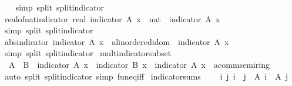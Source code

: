 \begin{isabellebody}
%
\isadelimproof
\ \ %
\endisadelimproof
%
\isatagproof
{}\isamarkupfalse%
\ {\isacharparenleft}simp\ split{\isacharcolon}\ split{\isacharunderscore}indicator{\isacharparenright}%
\endisatagproof
{\isafoldproof}%
%
\isadelimproof
\isanewline
%
\endisadelimproof
\isanewline
{}\isamarkupfalse%
\ real{\isacharunderscore}of{\isacharunderscore}nat{\isacharunderscore}indicator{\isacharcolon}\ {\isachardoublequoteopen}real\ {\isacharparenleft}indicator\ A\ x\ {\isacharcolon}{\isacharcolon}\ nat{\isacharparenright}\ {\isacharequal}\ indicator\ A\ x{\isachardoublequoteclose}\isanewline
%
\isadelimproof
\ \ %
\endisadelimproof
%
\isatagproof
{}\isamarkupfalse%
\ {\isacharparenleft}simp\ split{\isacharcolon}\ split{\isacharunderscore}indicator{\isacharparenright}%
\endisatagproof
{\isafoldproof}%
%
\isadelimproof
\isanewline
%
\endisadelimproof
\isanewline
{}\isamarkupfalse%
\ abs{\isacharunderscore}indicator{\isacharcolon}\ {\isachardoublequoteopen}{\isasymbar}indicator\ A\ x\ {\isacharcolon}{\isacharcolon}\ {\isacharprime}a{\isacharcolon}{\isacharcolon}linordered{\isacharunderscore}idom{\isasymbar}\ {\isacharequal}\ indicator\ A\ x{\isachardoublequoteclose}\isanewline
%
\isadelimproof
\ \ %
\endisadelimproof
%
\isatagproof
{}\isamarkupfalse%
\ {\isacharparenleft}simp\ split{\isacharcolon}\ split{\isacharunderscore}indicator{\isacharparenright}%
\endisatagproof
{\isafoldproof}%
%
\isadelimproof
\isanewline
%
\endisadelimproof
\isanewline
{}\isamarkupfalse%
\ mult{\isacharunderscore}indicator{\isacharunderscore}subset{\isacharcolon}\isanewline
\ \ {\isachardoublequoteopen}A\ {\isasymsubseteq}\ B\ {\isasymLongrightarrow}\ indicator\ A\ x\ {\isacharasterisk}\ indicator\ B\ x\ {\isacharequal}\ {\isacharparenleft}indicator\ A\ x\ {\isacharcolon}{\isacharcolon}\ {\isacharprime}a{\isacharcolon}{\isacharcolon}{\isacharbraceleft}comm{\isacharunderscore}semiring{\isacharunderscore}{}{\isacharbraceright}{\isacharparenright}{\isachardoublequoteclose}\isanewline
%
\isadelimproof
\ \ %
\endisadelimproof
%
\isatagproof
{}\isamarkupfalse%
\ {\isacharparenleft}auto\ split{\isacharcolon}\ split{\isacharunderscore}indicator\ simp{\isacharcolon}\ fun{\isacharunderscore}eq{\isacharunderscore}iff{\isacharparenright}%
\endisatagproof
{\isafoldproof}%
%
\isadelimproof
\isanewline
%
\endisadelimproof
\isanewline
{}\isamarkupfalse%
\ indicator{\isacharunderscore}sums{\isacharcolon}\ \isanewline
\ \ \ {\isachardoublequoteopen}{\isasymAnd}i\ j{\isachardot}\ i\ {\isasymnoteq}\ j\ {\isasymLongrightarrow}\ A\ i\ {\isasyminter}\ A\ j\ {\isacharequal}\ {\isacharbraceleft}{\isacharbraceright}{\isachardoublequoteclose}\isanewline

\end{isabellebody}
